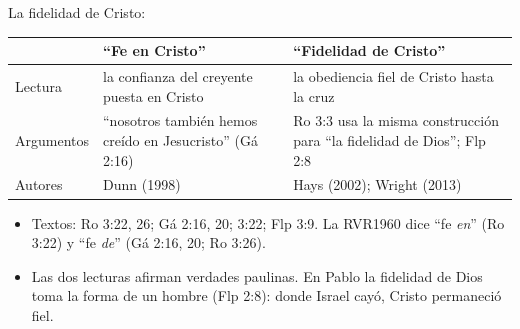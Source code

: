 \begin{frame}{La fidelidad de Cristo: }
\scriptsize\renewcommand{\arraystretch}{1.18}
\begin{tabular}{@{}>{\RaggedRight\arraybackslash}p{2.0cm}>{\RaggedRight\arraybackslash}p{4.9cm}>{\RaggedRight\arraybackslash}p{4.9cm}@{}}
\toprule
 & \textbf{``Fe en Cristo''} & \textbf{``Fidelidad de Cristo''} \\ \midrule
Lectura & la confianza del creyente puesta en Cristo & la obediencia fiel de Cristo hasta la cruz \\
Argumentos & ``nosotros también hemos creído en Jesucristo'' (Gá 2:16) & Ro 3:3 usa la misma construcción para ``la fidelidad de Dios''; Flp 2:8 \\
Autores & Dunn (1998) & Hays (2002); Wright (2013) \\
\bottomrule
\end{tabular}\par\medskip
\small
\begin{itemize}
\item Textos: Ro 3:22, 26; Gá 2:16, 20; 3:22; Flp 3:9. La RVR1960 dice ``fe \emph{en}'' (Ro 3:22) y ``fe \emph{de}'' (Gá 2:16, 20; Ro 3:26).
\item Las dos lecturas afirman verdades paulinas. En Pablo la fidelidad de Dios toma la forma de un hombre  (Flp 2:8): donde Israel cayó, Cristo permaneció fiel.
\end{itemize}
\end{frame}

